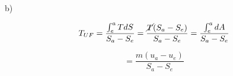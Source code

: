 b)

\[
T_{UF} = \frac{\int_{e}^{a} T dS}{S_a - S_e} = \frac{\cancel{T} (S_a - S_e)}{S_a - S_e} = \frac{\int_{e}^{a} dA}{S_a - S_e}
\]

\[
= \frac{m (u_a - u_e)}{S_a - S_e}
\]
